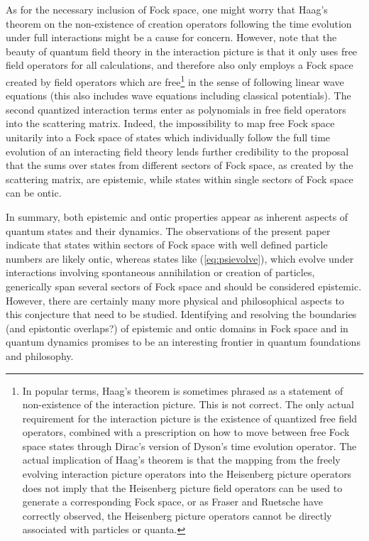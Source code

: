 \documentclass[final,3p,12pt]{elsarticle3}
\begin{document}
As for the necessary inclusion of Fock space, one might worry that
Haag's theorem \cite{haag1,haag2,fraser,ruetsche} on the non-existence of 
creation operators following the time evolution under full interactions
might be a cause for concern. However, note that the beauty of 
quantum field theory in the interaction picture is that it only 
uses free field operators for all calculations, and therefore also 
only employs a Fock space created by field operators which 
are free\footnote{In popular terms, Haag's theorem is sometimes 
phrased as a statement of non-existence of the interaction picture.
This is not correct. The only actual requirement for the interaction picture
is the existence of quantized free field operators, combined with a prescription
on how to move between free Fock space states through Dirac's version of
Dyson's time evolution operator. The actual implication of Haag's theorem
is that the mapping from the freely evolving interaction picture
operators into the Heisenberg picture operators does not imply that
the Heisenberg picture field operators can be used to generate 
a corresponding Fock space, or as Fraser \cite{fraser} and Ruetsche
\cite{ruetsche} have correctly observed, the Heisenberg picture 
operators cannot be directly associated with particles or quanta.} 
in the sense of following
linear wave equations (this also includes wave equations including
classical potentials). The second quantized interaction terms
enter as polynomials in free field operators into the scattering matrix. 
Indeed, the impossibility to map free Fock space unitarily into
a Fock space of states which individually follow the full time
evolution of an interacting field theory lends further credibility
to the proposal that the sums over states from different sectors of Fock
space, as created by the scattering matrix, are epistemic, while states
within single sectors of Fock space can be ontic.

In summary, both epistemic and ontic properties appear as inherent aspects
of quantum states and their dynamics.
The observations of the present paper indicate that states within sectors of Fock
space with well defined particle numbers are likely ontic, whereas states
like (\ref{eq:psievolve}), which evolve under interactions involving spontaneous
annihilation or creation of particles, generically span several sectors of Fock space 
and should be considered epistemic. 
However, there are certainly many more
physical and philosophical aspects to this conjecture that need to be studied.
Identifying and resolving the boundaries (and epistontic overlaps?) of epistemic 
and ontic domains in Fock space and in quantum dynamics promises to be an 
interesting frontier in quantum foundations and philosophy.
\end{document}
